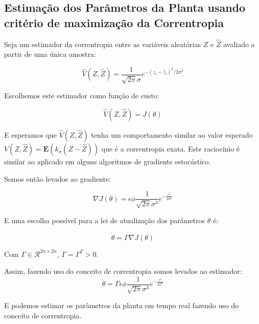 \documentclass[aspectratio=169]{beamer}
\begin{document}
\subsection{Estimação dos Parâmetros da Planta usando critério de maximização da Correntropia}
\begin{frame}
Seja um estimador da correntropia entre as variáveis aleatórias $Z$ e $\hat{Z}$ avaliado a partir de uma única amostra:

\begin{equation*}
\hat{V}(Z,\hat{Z}) =\frac{1}{\sqrt{2\pi}\sigma} e^{-(z_i - \hat{z}_i)^2/2\sigma^2}
\end{equation*}

Escolhemos este estimador como função de custo:

\begin{equation*}
\hat{V}(Z,\hat{Z}) = J(\theta)
\end{equation*}

E esperamos que $\hat{V}(Z,\hat{Z})$ tenha um comportamento similar ao valor esperado $V(Z,\hat{Z}) = \mathbf{E}(k_\sigma(Z-\hat{Z}))$ que é a correntropia exata. Este raciocínio é similar ao aplicado em alguns algoritmos de gradiente estocástico.

\end{frame}

\begin{frame}
Somos então levados ao gradiente:

\begin{equation*}
\nabla J(\theta) = \epsilon \phi \frac{1}{\sqrt{2\pi}\sigma^3} e^{-\frac{\epsilon^2}{2 \sigma^2}}  
\end{equation*}

E uma escolha possível para a lei de atualização dos parâmetros $\theta$ é:

\begin{equation*}
\dot{\theta} = \Gamma \nabla J(\theta)
\end{equation*}

Com  $\Gamma \in \mathcal{R}^{2n\times2n}$, $\Gamma = \Gamma^T > 0$.
\end{frame}

\begin{frame}
Assim, fazendo uso do conceito de correntropia somos levados ao estimador:
\begin{equation*}
\dot{\theta} = \Gamma \epsilon \phi \frac{1}{\sqrt{2\pi}\sigma^3} e^{-\frac{\epsilon^2}{2\sigma^2}}
\end{equation*}

E podemos estimar os parâmetros da planta em tempo real fazendo uso do conceito de correntropia.

\end{frame}
\end{document}
